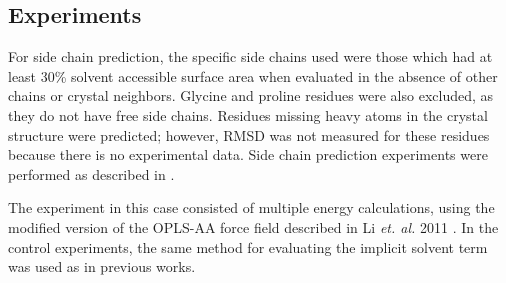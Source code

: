 \subsection*{Experiments}
\label{subsec:experiments}
For side chain prediction, the specific side chains used were those which had at least 30\% solvent accessible surface area when evaluated in the absence of other chains or crystal neighbors.
Glycine and proline residues were also excluded, as they do not have free side chains.
Residues missing heavy atoms in the crystal structure were predicted; however, RMSD was not measured for these residues because there is no experimental data.
Side chain prediction experiments were performed as described in \cite{jacobson2002role}.

The experiment in this case consisted of multiple energy calculations, using the modified version of the OPLS-AA force field described in Li {\it et. al.} 2011 \cite{li2011vsgb}.
In the control experiments, the same method for evaluating the implicit solvent term was used as in previous works.

